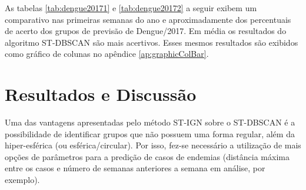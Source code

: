 As tabelas \ref{tab:dengue20171} e \ref{tab:dengue20172} a seguir exibem um comparativo nas primeiras semanas do ano e aproximadamente dos percentuais de acerto dos grupos de previsão de Dengue/2017. Em média os resultados do algoritmo \acrshort{ST-DBSCAN} são mais acertivos. Esses mesmos resultados são exibidos como gráfico de colunas no apêndice \ref{ap:graphicColBar}.

\begin{table}[ht!]
	\centering
\end{table}

\begin{table}[ht!]
	\centering
\end{table}

\section{Resultados e Discussão}
\label{sec:discussao}
Uma das vantagens apresentadas pelo método ST-IGN sobre o \acrshort{ST-DBSCAN} é a possibilidade de identificar grupos que não possuem uma forma regular, além da hiper-esférica (ou esférica/circular). Por isso, fez-se necessário a utilização de mais opções de parâmetros para a predição de casos de endemias (distância máxima entre os casos e número de semanas anteriores a semana em análise, por exemplo).


